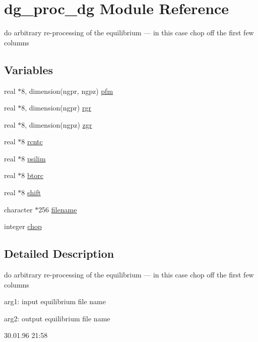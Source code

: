 \hypertarget{namespacedg__proc__dg}{
\section{dg\_\-proc\_\-dg Module Reference}
\label{namespacedg__proc__dg}
}
do arbitrary re-processing of the equilibrium --- in this case chop off the first few columns  


\subsection*{Variables}
\begin{CompactItemize}
\item 
real $\ast$8, dimension(ngpr, ngpz) \hyperlink{namespacedg__proc__dg_34d4b6308d30eeff40494270ca3e41dd}{pfm}
\item 
real $\ast$8, dimension(ngpr) \hyperlink{namespacedg__proc__dg_37701a396c79a6a032240cbce2a97e69}{rgr}
\item 
real $\ast$8, dimension(ngpz) \hyperlink{namespacedg__proc__dg_6664346fe46f234f41c923f7d8710b09}{zgr}
\item 
real $\ast$8 \hyperlink{namespacedg__proc__dg_a41e0e0e8c2ba411d2b43e2265775189}{rcntc}
\item 
real $\ast$8 \hyperlink{namespacedg__proc__dg_5107aa7a882e962895ad0db819eac7f9}{psilim}
\item 
real $\ast$8 \hyperlink{namespacedg__proc__dg_4858e0f24b3a2b945edb969aa3397018}{btorc}
\item 
real $\ast$8 \hyperlink{namespacedg__proc__dg_5b2c26eb45e5141de307ba77ec9b63f7}{shift}
\item 
character $\ast$256 \hyperlink{namespacedg__proc__dg_afbcde755b792e734f84703b785a4725}{filename}
\item 
integer \hyperlink{namespacedg__proc__dg_db49100523d7293683f277516929fea3}{chop}
\end{CompactItemize}


\subsection{Detailed Description}
do arbitrary re-processing of the equilibrium --- in this case chop off the first few columns 

arg1: input equilibrium file name

arg2: output equilibrium file name

\begin{Desc}
\item[Version:]30.01.96 21:58 \end{Desc}



